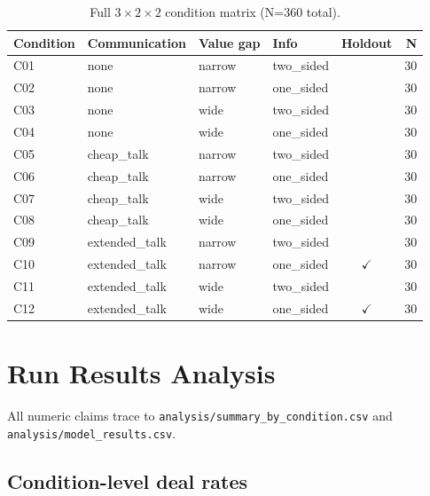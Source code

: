 \documentclass[11pt]{article}
\begin{document}
\begin{table}[htbp]
\centering
\small
\begin{tabularx}{\textwidth}{@{}l l l l c r@{}}
\toprule
\textbf{Condition} & \textbf{Communication} & \textbf{Value gap} & \textbf{Info} & \textbf{Holdout} & \textbf{N} \\
\midrule
C01 & none & narrow & two\_sided & & 30 \\
C02 & none & narrow & one\_sided & & 30 \\
C03 & none & wide & two\_sided & & 30 \\
C04 & none & wide & one\_sided & & 30 \\
C05 & cheap\_talk & narrow & two\_sided & & 30 \\
C06 & cheap\_talk & narrow & one\_sided & & 30 \\
C07 & cheap\_talk & wide & two\_sided & & 30 \\
C08 & cheap\_talk & wide & one\_sided & & 30 \\
C09 & extended\_talk & narrow & two\_sided & & 30 \\
C10 & extended\_talk & narrow & one\_sided & $\checkmark$ & 30 \\
C11 & extended\_talk & wide & two\_sided & & 30 \\
C12 & extended\_talk & wide & one\_sided & $\checkmark$ & 30 \\
\bottomrule
\end{tabularx}
\caption{Full $3 \times 2 \times 2$ condition matrix (N=360 total).}
\label{tab:conditions}
\end{table}

\section{Run Results Analysis}

All numeric claims trace to \texttt{analysis/summary\_by\_condition.csv} and \texttt{analysis/model\_results.csv}.

\subsection{Condition-level deal rates}
\end{document}
